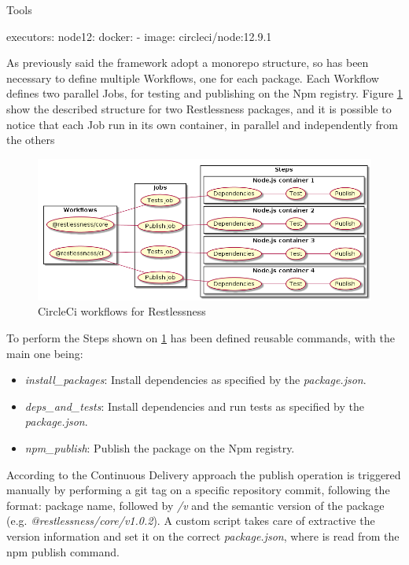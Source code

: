 \begin{chapter}{Tools}
    \bigskip
    \begin{code}[caption=Reusable executor definition, label={lst:ci_executor}]
executors:
  node12:
    docker:
      - image: circleci/node:12.9.1
    \end{code}
    As previously said the framework adopt a monorepo structure, so has been necessary
    to define multiple Workflows, one for each package. Each Workflow defines two
    parallel Jobs, for testing and publishing on the Npm registry.
    Figure \ref{fig:ci_workflow_diagram} show the described structure for two Restlessness
    packages, and it is possible to notice that each Job run in its own container,
    in parallel and independently from the others

    \begin{figure}
        \centering
        \includegraphics[width=\linewidth]{source/diagrams/ci_workflow.png}
        \caption{CircleCi workflows for Restlessness}
        \label{fig:ci_workflow_diagram}
    \end{figure}

    To perform the Steps shown on \ref{fig:ci_workflow_diagram} has been defined
    reusable commands, with the main one being:
    \begin{itemize}
        \item \textit{install\_packages}: Install dependencies as specified by the
            \textit{package.json}.
        \item \textit{deps\_and\_tests}: Install dependencies and run tests as
            specified by the \textit{package.json}.
        \item \textit{npm\_publish}: Publish the package on the Npm registry.
    \end{itemize}

    According to the Continuous Delivery approach the publish operation is triggered
    manually by performing a git tag on a specific repository commit, following the
    format: package name, followed by \textit{/v} and the semantic version of the
    package (e.g. \textit{@restlessness/core/v1.0.2}). A custom script takes care
    of extractive the version information and set it on the correct \textit{package.json},
    where is read from the npm publish command.


\end{chapter}

